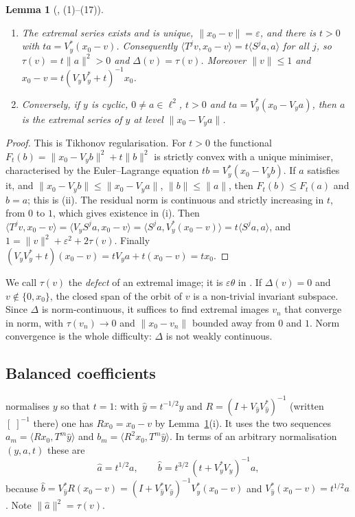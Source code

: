 \documentclass[11pt]{article}
\newtheorem{lemma}[theorem]{Lemma}
\theoremstyle{definition}
\newcommand{\ip}[2]{\langle #1,#2\rangle}
\newcommand{\norm}[1]{\lVert #1\rVert}
\newcommand{\ha}{\hat a}
\newcommand{\hb}{\hat b}
\begin{document}
\begin{lemma}[\cite{E}, (1)--(17)]\label{lem:framework}
\begin{enumerate}[label=\textup{(\roman*)}]
\item The extremal series exists and is unique, $\norm{x_0-v}=\varepsilon$, and there is $t>0$
with $ta=V_y^*(x_0-v)$. Consequently $\ip{T^jv}{x_0-v}=t\ip{S^ja}{a}$ for all $j$, so
$\tau(v)=t\norm a^2>0$ and $\Delta(v)=\tau(v)$. Moreover $\norm v\le1$ and
$x_0-v=t(V_yV_y^*+t)^{-1}x_0$.
\item Conversely, if $y$ is cyclic, $0\ne a\in\ell^2$, $t>0$ and $ta=V_y^*(x_0-V_ya)$, then
$a$ is the extremal series of $y$ at level $\norm{x_0-V_ya}$.
\end{enumerate}
\end{lemma}
\begin{proof}
This is Tikhonov regularisation. For $t>0$ the functional
$F_t(b)=\norm{x_0-V_yb}^2+t\norm b^2$ is strictly convex with a unique minimiser, characterised
by the Euler--Lagrange equation $tb=V_y^*(x_0-V_yb)$. If $a$ satisfies it, and
$\norm{x_0-V_yb}\le\norm{x_0-V_ya}$, $\norm b\le\norm a$, then $F_t(b)\le F_t(a)$ and $b=a$;
this is (ii). The residual norm is continuous and strictly increasing in $t$, from $0$ to $1$,
which gives existence in (i). Then
$\ip{T^jv}{x_0-v}=\ip{V_yS^ja}{x_0-v}=\ip{S^ja}{V_y^*(x_0-v)}=t\ip{S^ja}{a}$, and
$1=\norm v^2+\varepsilon^2+2\tau(v)$. Finally
$(V_yV_y^*+t)(x_0-v)=tV_ya+t(x_0-v)=tx_0$.
\end{proof}

We call $\tau(v)$ the \emph{defect} of an extremal image; it is $\varepsilon\theta$ in \cite{E}.
If $\Delta(v)=0$ and $v\notin\{0,x_0\}$, the closed span of the orbit of $v$ is a non-trivial
invariant subspace. Since $\Delta$ is norm-continuous, it suffices to find extremal images
$v_n$ that converge in norm, with $\tau(v_n)\to0$ and $\norm{x_0-v_n}$ bounded away from $0$
and $1$. Norm convergence is the whole difficulty: $\Delta$ is not weakly continuous.

\subsection*{Balanced coefficients}
\cite{E} normalises $y$ so that $t=1$: with $\hat y=t^{-1/2}y$ and
$R=(I+V_{\hat y}V_{\hat y}^*)^{-1}$ (written $[\;]^{-1}$ there) one has $Rx_0=x_0-v$ by
Lemma~\ref{lem:framework}(i). It uses the two sequences
$a_m=\ip{Rx_0}{T^m\hat y}$ and $b_m=\ip{R^2x_0}{T^m\hat y}$. In terms of an arbitrary
normalisation $(y,a,t)$ these are
\begin{equation}\label{eq:balanced}
\ha=t^{1/2}a,\qquad \hb=t^{3/2}\,(t+V_y^*V_y)^{-1}a ,
\end{equation}
because $\hb=V_{\hat y}^*R(x_0-v)=(I+V_{\hat y}^*V_{\hat y})^{-1}V_{\hat y}^*(x_0-v)$ and
$V_{\hat y}^*(x_0-v)=t^{1/2}a$. Note $\norm{\ha}^2=\tau(v)$.
\end{document}
